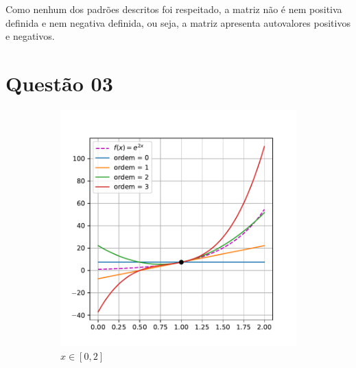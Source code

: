 \documentclass[10pt, a4paper]{article}
\begin{document}
Como nenhum dos padrões descritos foi respeitado, a matriz não é nem positiva definida e nem negativa definida, 
ou seja, a matriz apresenta autovalores positivos e negativos.

\section[q03]{Questão 03}

\begin{figure}
    \centering
    \begin{subfigure}[b]{0.45\textwidth}
        \centering
        \includegraphics[width=\textwidth]{images/q3_1.pdf}
        \caption{$x \in [0, 2]$}
        \label{fig:q3_1}
    \end{subfigure}
    \hfill
    \begin{subfigure}[b]{0.45\textwidth}
        \centering

\end{subfigure}
\end{figure}
\end{document}
